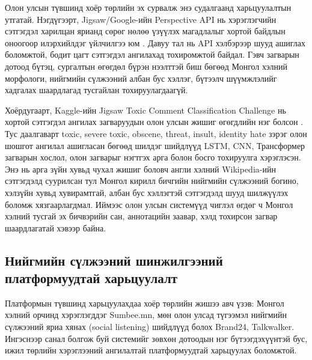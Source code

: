Олон улсын түвшинд хоёр төрлийн эх сурвалж энэ судалгаанд харьцуулалтын
утгатай. Нэгдүгээрт, Jigsaw/Google-ийн Perspective API нь хэрэглэгчийн
сэтгэгдэл харилцан ярианд сөрөг нөлөө үзүүлэх магадлалыг хортой байдлын
оноогоор илэрхийлдэг үйлчилгээ юм \cite{perspectiveApi2026}. Давуу тал нь API
хэлбэрээр шууд ашиглах боломжтой, бодит цагт сэтгэгдэл ангилахад тохиромжтой
байдал. Гэвч загварын дотоод бүтэц, сургалтын өгөгдөл бүрэн нээлттэй биш бөгөөд
Монгол хэлний морфологи, нийгмийн сүлжээний албан бус хэллэг, бүтээлч
шүүмжлэлийг хадгалах шаардлагад тусгайлан тохируулагдаагүй.

Хоёрдугаарт, Kaggle-ийн Jigsaw Toxic Comment Classification Challenge нь хортой
сэтгэгдэл ангилах загваруудын олон улсын жишиг өгөгдлийн нэг болсон
\cite{kaggleJigsaw2018}. Тус даалгаварт toxic, severe toxic, obscene, threat,
insult, identity hate зэрэг олон шошгот ангилал ашигласан бөгөөд шилдэг
шийдлүүд LSTM, CNN, Трансформер загварын хослол, олон загварыг нэгтгэх арга
болон босго тохируулга хэрэглэсэн. Энэ нь арга зүйн хувьд чухал жишиг боловч
англи хэлний
Wikipedia-ийн сэтгэгдэлд суурилсан тул Монгол кирилл бичгийн нийгмийн сүлжээний
богино, хэлзүйн хувьд хувирамтгай, албан бус хэллэгтэй сэтгэгдэлд шууд
шилжүүлэх боломж хязгаарлагдмал. Иймээс олон улсын системүүд чиглэл өгдөг ч
Монгол хэлний тусгай эх бичвэрийн сан, аннотацийн заавар, хэлд тохирсон загвар шаардлагатай
хэвээр байна.

\subsection{Нийгмийн сүлжээний шинжилгээний платформуудтай харьцуулалт}

Платформын түвшинд харьцуулахдаа хоёр төрлийн жишээ авч үзэв: Монгол хэлний
орчинд хэрэглэгддэг Sumbee.mn, мөн олон улсад түгээмэл нийгмийн сүлжээний яриа
хянах (social listening) шийдлүүд болох Brand24, Talkwalker. Ингэснээр санал
болгож буй системийг зөвхөн дотоодын нэг бүтээгдэхүүнтэй бус, ижил төрлийн
хэрэглээний ангилалтай платформуудтай харьцуулах боломжтой.

